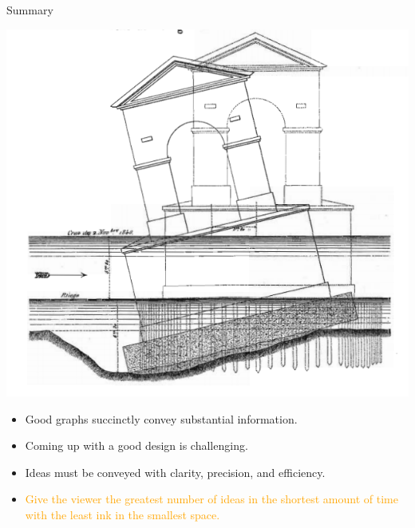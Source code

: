\documentclass[
  ignorenonframetext,
]{beamer}
\begin{document}
\begin{frame}{Summary}
\label{summary}
\begin{minipage}{0.45\textwidth}
\centering
\includegraphics[width=\textwidth]{excellence_figs/fig_35.png}
\end{minipage}
\hfill
\begin{minipage}{0.5\textwidth}
\footnotesize
\begin{itemize}
  \item Good graphs succinctly convey substantial information.
  \item Coming up with a good design is challenging.
  \item Ideas must be conveyed with clarity, precision, and efficiency.
  \item \textcolor{orange}{Give the viewer the greatest number of ideas in the shortest amount of time with the least ink in the smallest space.}
\end{itemize}
\end{minipage}
\end{frame}
\end{document}
